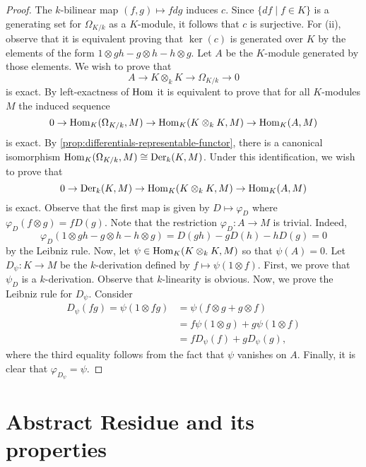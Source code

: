 \begin{proof}
	The $k$-bilinear map $(f,g) \mapsto fdg$ induces $c$. Since $\{df \mid f\in K\}$ is a generating set for $\Omega_{K/k}$ as a $K$-module, it follows that $c$ is surjective. For (ii), observe that it is equivalent proving that $\ker(c)$ is generated over $K$ by the elements of the form $1 \otimes gh - g \otimes h - h \otimes g$. Let $A$ be the $K$-module generated by those elements. We wish to prove that
	\[
		A \to K \otimes_{k} K \to \Omega_{K/k} \to 0
	\]
	is exact. By left-exactness of $\operatorname{Hom}$ it is equivalent to prove that for all $K$-modules $M$ the induced sequence
	\[
		0 \to \operatorname{Hom}_{K}(\Omega_{K/k}, M) \to \operatorname{Hom}_{K}(K \otimes_{k} K, M) \to \operatorname{Hom}_{K}(A, M) 
	\]
	is exact. By \cref{prop:differentials-representable-functor}, there is a canonical isomorphism $\operatorname{Hom}_{K}(\Omega_{K/k}, M) \cong \operatorname{Der}_{k}(K, M)$. Under this identification, we wish to prove that
	\[
		0 \to \operatorname{Der}_{k}(K, M) \to \operatorname{Hom}_{K}(K \otimes_{k} K, M) \to \operatorname{Hom}_{K}(A, M) 
	\]
	is exact. Observe that the first map is given by $D \mapsto \varphi_{D}$ where $\varphi_{D}(f \otimes g) = f D(g)$. Note that the restriction $\varphi_{D}\colon A \to M$ is trivial. Indeed,
	\[
		\varphi_{D}(1 \otimes gh - g \otimes h - h \otimes g) = D(gh) - gD(h) - hD(g) = 0
	\]
	by the Leibniz rule. Now, let $\psi\in \operatorname{Hom}_{K}(K \otimes_{k} K, M)$ so that $\psi(A) = 0$. Let $D_{\psi}\colon K \to M$ be the $k$-derivation defined by $f \mapsto \psi(1 \otimes f)$. First, we prove that $\psi_{D}$ is a $k$-derivation. Observe that $k$-linearity is obvious. Now, we prove the Leibniz rule for $D_{\psi}$. Consider
	\begin{align*}
		D_{\psi}(fg) = \psi(1 \otimes fg) &= \psi(f \otimes g + g \otimes f) \\ &= f \psi (1 \otimes g) + g \psi (1 \otimes f) \\ &= f D_{\psi} (f) + g D_{\psi} (g),
	\end{align*}
	where the third equality follows from the fact that $\psi$ vanishes on $A$. Finally, it is clear that $\varphi_{D_{\psi}} = \psi$. 
\end{proof}
\section{Abstract Residue and its properties}
